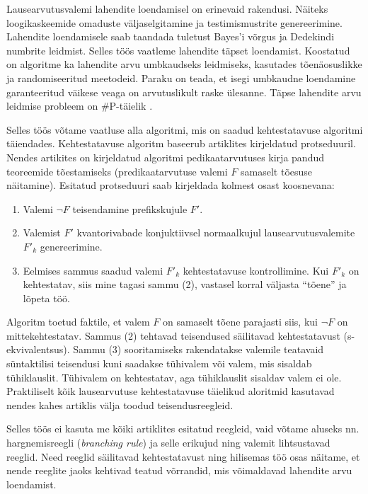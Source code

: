 \documentclass[12pt,estonian]{report}
\begin{document}
Lausearvutusvalemi lahendite loendamisel on erinevaid rakendusi. Näiteks
loogikaskeemide omaduste väljaselgitamine ja testimismustrite genereerimine.
Lahendite loendamisele saab taandada tuletust Bayes'i võrgus ja Dedekindi
numbrite leidmist. Selles töös vaatleme lahendite täpset loendamist.
Koostatud on algoritme ka lahendite arvu umbkaudseks leidmiseks,
kasutades tõenäosuslikke ja randomiseeritud meetodeid.
Paraku on teada, et isegi umbkaudne loendamine garanteeritud väikese veaga on
arvutuslikult raske ülesanne. Täpse lahendite arvu leidmise probleem
on \#P-täielik \cite{key-8}.

Selles töös võtame vaatluse alla algoritmi, mis on saadud kehtestatavuse
algoritmi täiendades. Kehtestatavuse algoritm baseerub artiklites
\cite{key-1,key-2} kirjeldatud protseduuril. Nendes artikites on
kirjeldatud algoritmi pedikaatarvutuses kirja pandud teoreemide tõestamiseks
(predikaatarvutuse valemi $F$ samaselt tõesuse näitamine). Esitatud
protseduuri saab kirjeldada kolmest osast koosnevana:

\begin{enumerate}
\item Valemi $\neg F$ teisendamine prefikskujule $F'$.
\item Valemist $F'$ kvantorivabade konjuktiivsel normaalkujul lausearvutusvalemite $F'_{k}$
genereerimine.
\item Eelmises sammus saadud valemi $F'_{k}$ kehtestatavuse kontrollimine.
Kui $F'_{k}$ on kehtestatav, siis mine tagasi sammu (2), vastasel
korral väljasta {}``tõene'' ja lõpeta töö.
\end{enumerate}
Algoritm toetud faktile, et valem $F$ on samaselt tõene parajasti
siis, kui $\neg F$ on mittekehtestatav. Sammus (2) tehtavad teisendused
säilitavad kehtestatavust (s-ekvivalentsus). Sammu (3) sooritamiseks
rakendatakse valemile teatavaid süntaktilisi teisendusi kuni saadakse
tühivalem või valem, mis sisaldab tühiklauslit. Tühivalem on kehtestatav,
aga tühiklauslit sisaldav valem ei ole. Praktiliselt kõik lausearvutuse
kehtestatavuse täielikud aloritmid kasutavad nendes kahes artiklis välja toodud
teisendusreegleid.

Selles töös ei kasuta me kõiki artiklites \cite{key-1,key-2}
esitatud reegleid, vaid võtame aluseks nn. hargnemisreegli
(\emph{branching rule}) ja selle erikujud ning valemit lihtsustavad
reeglid. Need reeglid säilitavad kehtestatavust ning hilisemas töö osas
näitame, et nende reeglite jaoks kehtivad teatud võrrandid,
mis võimaldavad lahendite arvu loendamist.
\end{document}
